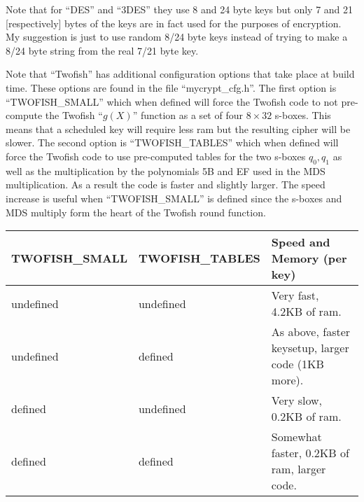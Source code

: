 \documentclass{book}
\begin{document}
Note that for ``DES'' and ``3DES'' they use 8 and 24 byte keys but only 7 and 21 [respectively] bytes of the keys are in
fact used for the purposes of encryption.  My suggestion is just to use random 8/24 byte keys instead of trying to make a 8/24
byte string from the real 7/21 byte key.

Note that ``Twofish'' has additional configuration options that take place at build time.  These options are found in
the file ``mycrypt\_cfg.h''.  The first option is ``TWOFISH\_SMALL'' which when defined will force the Twofish code
to not pre-compute the Twofish ``$g(X)$'' function as a set of four $8 \times 32$ s-boxes.  This means that a scheduled
key will require less ram but the resulting cipher will be slower.  The second option is ``TWOFISH\_TABLES'' which when
defined will force the Twofish code to use pre-computed tables for the two s-boxes $q_0, q_1$ as well as the multiplication
by the polynomials 5B and EF used in the MDS multiplication.  As a result the code is faster and slightly larger.  The
speed increase is useful when ``TWOFISH\_SMALL'' is defined since the s-boxes and MDS multiply form the heart of the
Twofish round function.

\begin{small}
\begin{center}
\begin{tabular}{|l|l|l|}
\hline TWOFISH\_SMALL & TWOFISH\_TABLES & Speed and Memory (per key) \\
\hline undefined & undefined & Very fast, 4.2KB of ram. \\
\hline undefined & defined & As above, faster keysetup, larger code (1KB more). \\
\hline defined & undefined & Very slow, 0.2KB of ram. \\
\hline defined & defined & Somewhat faster, 0.2KB of ram, larger code. \\
\hline
\end{tabular}
\end{center}
\end{small}
\end{document}
